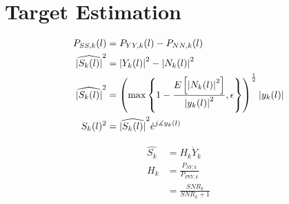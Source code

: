 \section{Target Estimation} \label{sec:target_estimation}

\begin{align}
  P_{SS,k}(l) &= P_{YY,k}(l) - P_{NN,k}(l)
  \label{eq:psds1} \\
  \widehat{\abs{S_{k}(l)}}^{2} &= \abs{Y_{k}(l)}^{2}-\abs{N_{k}(l)}^{2}
  \label{eq:psds2} \\
  \widehat{\abs{S_{k}(l)}}^{2} &=
  \left(\max{\left\{1-\frac{E\left[\abs{N_{k}(l)}^{2}\right]}{\abs{y_{k}(l)}^{2}},\epsilon\right\}}\right)^{\frac{1}{2}}\abs{y_{k}(l)}
  \label{eq:psds3} \\
  S_{k}(l)^{2} &= \widehat{\abs{S_{k}(l)}}^{2} \dot e^{j\measuredangle y_{k}(l)}
\end{align}

\begin{align}
  \hat{S_{k}} &= H_{k} \dot Y_{k}
  \label{eq:wiener1} \\
  H_{k} &= \frac{P_{SY,k}}{P_{PYY,k}}
  \label{eq:wiener2} \\
  &= \frac{SNR_{k}}{SNR_{k}+1}
  \label{eq:wiener3}
\end{align}
